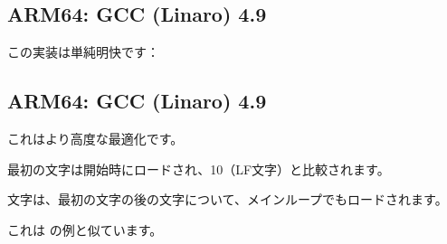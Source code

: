 \subsection{ARM64: \NonOptimizing GCC (Linaro) 4.9}

この実装は単純明快です：



\subsection{ARM64: \Optimizing GCC (Linaro) 4.9}

これはより高度な最適化です。

最初の文字は開始時にロードされ、10（\ac{LF}文字）と比較されます。

文字は、最初の文字の後の文字について、メインループでもロードされます。

これは  の例と似ています。


